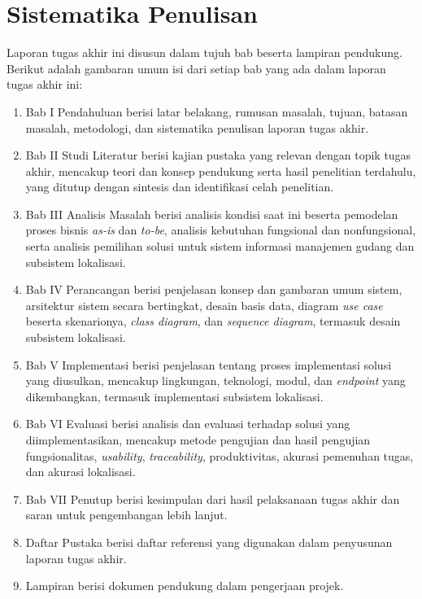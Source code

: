 \section{Sistematika Penulisan}
Laporan tugas akhir ini disusun dalam tujuh bab beserta lampiran pendukung. Berikut adalah gambaran umum isi dari setiap bab yang ada dalam laporan tugas akhir ini:
\begin{enumerate}
\item Bab I Pendahuluan berisi latar belakang, rumusan masalah, tujuan, batasan masalah, metodologi, dan sistematika penulisan laporan tugas akhir.
\item Bab II Studi Literatur berisi kajian pustaka yang relevan dengan topik tugas akhir, mencakup teori dan konsep pendukung serta hasil penelitian terdahulu, yang ditutup dengan sintesis dan identifikasi celah penelitian.
\item Bab III Analisis Masalah berisi analisis kondisi saat ini beserta pemodelan proses bisnis \textit{as-is} dan \textit{to-be}, analisis kebutuhan fungsional dan nonfungsional, serta analisis pemilihan solusi untuk sistem informasi manajemen gudang dan subsistem lokalisasi.
\item Bab IV Perancangan berisi penjelasan konsep dan gambaran umum sistem, arsitektur sistem secara bertingkat, desain basis data, diagram \textit{use case} beserta skenarionya, \textit{class diagram}, dan \textit{sequence diagram}, termasuk desain subsistem lokalisasi.
\item Bab V Implementasi berisi penjelasan tentang proses implementasi solusi yang diusulkan, mencakup lingkungan, teknologi, modul, dan \textit{endpoint} yang dikembangkan, termasuk implementasi subsistem lokalisasi.
\item Bab VI Evaluasi berisi analisis dan evaluasi terhadap solusi yang diimplementasikan, mencakup metode pengujian dan hasil pengujian fungsionalitas, \textit{usability}, \textit{traceability}, produktivitas, akurasi pemenuhan tugas, dan akurasi lokalisasi.
\item Bab VII Penutup berisi kesimpulan dari hasil pelaksanaan tugas akhir dan saran untuk pengembangan lebih lanjut.
\item Daftar Pustaka berisi daftar referensi yang digunakan dalam penyusunan laporan tugas akhir.
\item Lampiran berisi dokumen pendukung dalam pengerjaan projek.
\end{enumerate}
